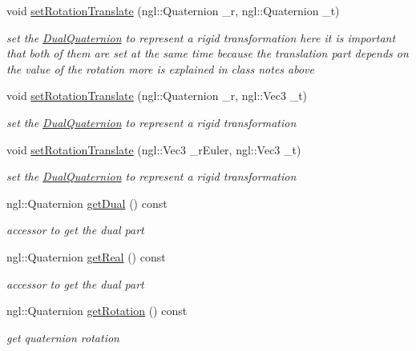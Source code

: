 \begin{DoxyCompactItemize}
void \hyperlink{class_dual_quaternion_afddda19f44d7dad400833a791e03ae87}{set\-Rotation\-Translate} (ngl\-::\-Quaternion \-\_\-r, ngl\-::\-Quaternion \-\_\-t)
\begin{DoxyCompactList}\small\item\em set the \hyperlink{class_dual_quaternion}{Dual\-Quaternion} to represent a rigid transformation here it is important that both of them are set at the same time because the translation part depends on the value of the rotation more is explained in class notes above \end{DoxyCompactList}\item 
void \hyperlink{class_dual_quaternion_ad0e3f4d58c0f95a7fbc7b29b978dc29b}{set\-Rotation\-Translate} (ngl\-::\-Quaternion \-\_\-r, ngl\-::\-Vec3 \-\_\-t)
\begin{DoxyCompactList}\small\item\em set the \hyperlink{class_dual_quaternion}{Dual\-Quaternion} to represent a rigid transformation \end{DoxyCompactList}\item 
void \hyperlink{class_dual_quaternion_afce9ec6224704171e39d5655f32011b7}{set\-Rotation\-Translate} (ngl\-::\-Vec3 \-\_\-r\-Euler, ngl\-::\-Vec3 \-\_\-t)
\begin{DoxyCompactList}\small\item\em set the \hyperlink{class_dual_quaternion}{Dual\-Quaternion} to represent a rigid transformation \end{DoxyCompactList}\item 
ngl\-::\-Quaternion \hyperlink{class_dual_quaternion_a5f1476b36b004a94e53b9d60b668b50c}{get\-Dual} () const 
\begin{DoxyCompactList}\small\item\em accessor to get the dual part \end{DoxyCompactList}\item 
ngl\-::\-Quaternion \hyperlink{class_dual_quaternion_a0db2c4b45e2b835ee9f3390345d584fe}{get\-Real} () const 
\begin{DoxyCompactList}\small\item\em accessor to get the dual part \end{DoxyCompactList}\item 
ngl\-::\-Quaternion \hyperlink{class_dual_quaternion_a3c132edecb50d9a8e111022fd3a442cb}{get\-Rotation} () const 
\begin{DoxyCompactList}\small\item\em get quaternion rotation \end{DoxyCompactList}\item 

\end{DoxyCompactItemize}

